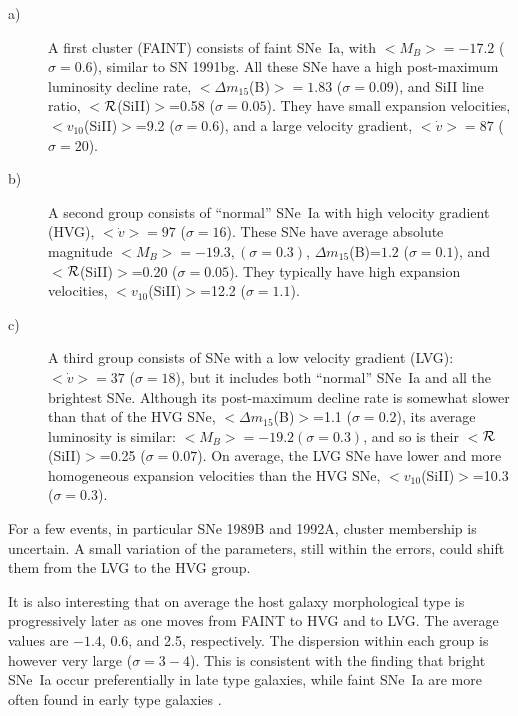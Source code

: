 \documentclass[preprint2]{aastex}
\newcommand{\dm}{$\Delta m_{15}$(B)}
\newcommand{\RSi}{$\cal R$(SiII)}
\newcommand{\vSiiX}{$v_{10}$(SiII)}
\begin{document}
\begin{description} 

\item[a)] A first cluster (FAINT) consists of faint SNe~Ia, with
  $<M_B> = -17.2$ ($\sigma=0.6$), similar to SN 1991bg.  All these SNe
  have a high post-maximum luminosity decline rate, $<$\dm$>=1.83$
  ($\sigma=0.09$), and SiII line ratio, $<$\RSi$>$=0.58
  ($\sigma=0.05$). They have small expansion velocities,
  $<$\vSiiX$>$=9.2 ($\sigma=0.6$), and a large velocity gradient,
  $<\dot{v}> = 87$ ($\sigma=20$).

\item[b)] A second group consists of ``normal'' SNe~Ia with high
velocity gradient (HVG), $<\dot{v}>=97$ ($\sigma=16$). 
These SNe have average absolute magnitude $<M_B> = -19.3, (\sigma=0.3)$, 
\dm=$1.2$ ($\sigma=0.1$), and $<$\RSi$>$=0.20 ($\sigma=0.05$). 
They typically have high expansion velocities, $<$\vSiiX$>$=12.2 
($\sigma=1.1$).

\item[c)] A third group consists of SNe with a low velocity gradient (LVG):
$<\dot{v}> = 37$ ($\sigma=18$), but it includes both ``normal'' SNe~Ia and 
all the brightest SNe. Although its post-maximum decline rate is somewhat 
slower than that of the HVG SNe, $<$\dm$>$=1.1 ($\sigma=0.2$), its average 
luminosity is similar: $<M_B> = -19.2 (\sigma=0.3)$, and so is their 
$<$\RSi$>$=0.25 ($\sigma=0.07$).  
On average, the LVG SNe have lower and more homogeneous expansion velocities than the HVG SNe, 
$<$\vSiiX$>$=10.3 ($\sigma=0.3$).
\end{description}

For a few events, in particular SNe 1989B and 1992A, cluster membership is
uncertain. A small variation of the parameters, still within the errors, could
shift them from the LVG to the HVG group.

It is also interesting that on average the host galaxy morphological type is
progressively later as one moves from FAINT to HVG and to LVG. The average
values are $-1.4$, 0.6, and 2.5, respectively. The dispersion within each group
is however very large ($\sigma=3-4$). This is consistent with the finding that
bright SNe~Ia occur preferentially in late type galaxies, while faint SNe~Ia 
are more often found in early type galaxies \citep{alt04}.\\
\end{document}
